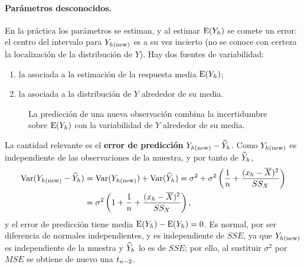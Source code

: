 \paragraph{Parámetros desconocidos.} En la práctica los parámetros se estiman, y al estimar
$\operatorname{E}(Y_h)$ se comete un error: el centro del intervalo para $Y_{h(\mathrm{new})}$ es a su vez incierto (no se
conoce con certeza la localización de la distribución de $Y$). Hay dos fuentes de
variabilidad:
\begin{enumerate}
  \item la asociada a la estimación de la respuesta media $\operatorname{E}(Y_h)$;
  \item la asociada a la distribución de $Y$ alrededor de su media.
\end{enumerate}

\begin{figure}[H]
  \centering
  \caption{La predicción de una nueva observación combina la incertidumbre sobre
    $\operatorname{E}(Y_h)$ con la variabilidad de $Y$ alrededor de su media.}
\end{figure}

La cantidad relevante es el \textbf{error de predicción} $Y_{h(\mathrm{new})}-\widehat{Y}_h$.
Como $Y_{h(\mathrm{new})}$ es
independiente de las observaciones de la muestra, y por tanto de $\widehat{Y}_h$,
\begin{align*}
  \operatorname{Var}(Y_{h(\mathrm{new})}-\widehat{Y}_h) &= \operatorname{Var}(Y_{h(\mathrm{new})}) + \operatorname{Var}(\widehat{Y}_h)
  = \sigma^2 + \sigma^2\left(\frac1n+\frac{(x_h-\overline{X})^2}{SS_X}\right) \\
  &= \sigma^2\left(1+\frac1n+\frac{(x_h-\overline{X})^2}{SS_X}\right),
\end{align*}
y el error de predicción tiene media $\operatorname{E}(Y_h)-\operatorname{E}(Y_h)=0$. Es normal, por ser diferencia de
normales independientes, y es independiente de $SSE$, ya que $Y_{h(\mathrm{new})}$ es independiente de la
muestra y $\widehat{Y}_h$ lo es de $SSE$; por ello, al sustituir $\sigma^2$ por $MSE$ se obtiene de
nuevo una $t_{n-2}$.

